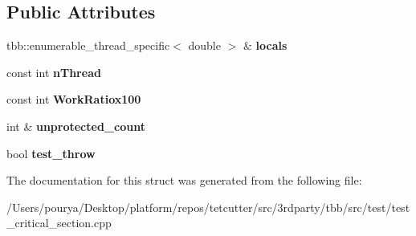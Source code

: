 \subsection*{Public Attributes}
\begin{DoxyCompactItemize}
\item 
\hypertarget{structBusyBodyScoped_a37e47f858397c1fa66cab022653ea549}{}tbb\+::enumerable\+\_\+thread\+\_\+specific$<$ double $>$ \& {\bfseries locals}\label{structBusyBodyScoped_a37e47f858397c1fa66cab022653ea549}

\item 
\hypertarget{structBusyBodyScoped_a647fca42de8efb8f627a54d0fd4c18d9}{}const int {\bfseries n\+Thread}\label{structBusyBodyScoped_a647fca42de8efb8f627a54d0fd4c18d9}

\item 
\hypertarget{structBusyBodyScoped_adf45d77298b0874abb0c4202b81c3155}{}const int {\bfseries Work\+Ratiox100}\label{structBusyBodyScoped_adf45d77298b0874abb0c4202b81c3155}

\item 
\hypertarget{structBusyBodyScoped_a82c3c2f495f4ad941bf166a4ee8e3947}{}int \& {\bfseries unprotected\+\_\+count}\label{structBusyBodyScoped_a82c3c2f495f4ad941bf166a4ee8e3947}

\item 
\hypertarget{structBusyBodyScoped_a0386d036f76b9e4f6de3cf7e8528142d}{}bool {\bfseries test\+\_\+throw}\label{structBusyBodyScoped_a0386d036f76b9e4f6de3cf7e8528142d}

\end{DoxyCompactItemize}


The documentation for this struct was generated from the following file\+:\begin{DoxyCompactItemize}
\item 
/\+Users/pourya/\+Desktop/platform/repos/tetcutter/src/3rdparty/tbb/src/test/test\+\_\+critical\+\_\+section.\+cpp\end{DoxyCompactItemize}
